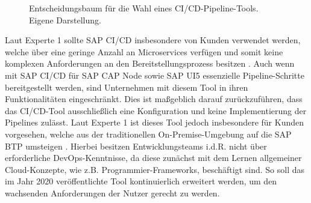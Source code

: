 \begin{center}
	\begin{figure}[H]\hspace*{-5mm}\hspace*{-11mm}
		\centering
		\caption[Entscheidungsbaum für die Wahl eines CI/CD-Pipeline-Tools]{Entscheidungsbaum für die Wahl eines CI/CD-Pipeline-Tools. Eigene Darstellung.}
		\label{fig:Entscheidungsbaum}
	\end{figure}
\end{center}
\vspace*{-15mm}
Laut Experte 1 sollte SAP CI/CD insbesondere von Kunden verwendet werden, welche über eine geringe Anzahl an Microservices verfügen und somit keine komplexen Anforderungen an den Bereitstellungsprozess besitzen \cite[Z. 58 ff.]{ProductOwnerSAPBTPProd&Infra.}. Auch wenn mit SAP CI/CD für SAP CAP Node sowie SAP UI5 essenzielle Pipeline-Schritte bereitgestellt werden, sind Unternehmen mit diesem Tool in ihren Funktionalitäten eingeschränkt. Dies ist maßgeblich darauf zurückzuführen, dass das CI/CD-Tool ausschließlich eine Konfiguration und keine Implementierung der Pipelines zulässt. 
Laut Experte 1 ist dieses Tool jedoch insbesondere für Kunden vorgesehen, welche aus der traditionellen On-Premise-Umgebung auf die SAP BTP umsteigen \cite[Z. 58 ff.]{ProductOwnerSAPBTPProd&Infra.}. Hierbei besitzen Entwicklungsteams i.d.R. nicht über erforderliche DevOps-Kenntnisse, da diese zunächst mit dem Lernen allgemeiner Cloud-Konzepte, wie z.B. Programmier-Frameworks, beschäftigt sind. So soll das im Jahr 2020 veröffentlichte Tool kontinuierlich erweitert werden, um den wachsenden Anforderungen der Nutzer gerecht zu werden. 

